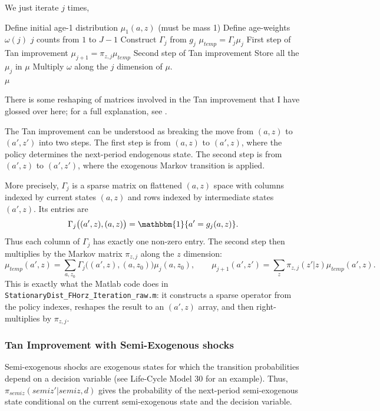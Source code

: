 We just iterate $j$ times,
\begin{algorithmic}
 \State Define initial age-1 distribution $\mu_1(a,z)$ (must be mass 1)
 \State Define age-weights $\omega(j)$
 \For $j$ counts from $1$ to $J-1$
  \State Construct $\Gamma_j$ from $g_j$
  \State $\mu_{temp}=\Gamma_j \mu_j$ \Comment First step of Tan improvement
  \State $\mu_{j+1}=\pi_{z,j} \mu_{temp}$ \Comment Second step of Tan improvement
 \EndFor
 \State Store all the $\mu_j$ in $\mu$
  \State Multiply $\omega$ along the $j$ dimension of $\mu$.
 \\ \Return $\mu$
 \end{algorithmic}
There is some reshaping of matrices involved in the Tan improvement that I have glossed over here; for a full explanation, see \cite{Tan2020}.

The Tan improvement can be understood as breaking the move from $(a,z)$ to $(a',z')$ into two steps. The first step is from $(a,z)$ to $(a',z)$, where the policy determines the next-period endogenous state. The second step is from $(a',z)$ to $(a',z')$, where the exogenous Markov transition is applied.

More precisely, $\Gamma_j$ is a sparse matrix on flattened $(a,z)$ space with columns indexed by current states $(a,z)$ and rows indexed by intermediate states $(a',z)$. Its entries are
\[
\Gamma_j\big((a',z),(a,z)\big)=\mathbbm{1}\{a'=g_j(a,z)\}.
\]
Thus each column of $\Gamma_j$ has exactly one non-zero entry. The second step then multiplies by the Markov matrix $\pi_{z,j}$ along the $z$ dimension:
\[
\mu_{temp}(a',z)=\sum_{a,z_0}\Gamma_j\big((a',z),(a,z_0)\big)\mu_j(a,z_0),
\qquad
\mu_{j+1}(a',z')=\sum_{z}\pi_{z,j}(z'|z)\mu_{temp}(a',z).
\]
This is exactly what the Matlab code does in \texttt{StationaryDist\_FHorz\_Iteration\_raw.m}: it constructs a sparse operator from the policy indexes, reshapes the result to an $(a',z)$ array, and then right-multiplies by $\pi_{z,j}$.

\subsubsection{Tan Improvement with Semi-Exogenous shocks}
Semi-exogenous shocks are exogenous states for which the transition probabilities depend on a decision variable (see Life-Cycle Model 30 for an example). Thus, $\pi_{semiz}(semiz'|semiz,d)$ gives the probability of the next-period semi-exogenous state conditional on the current semi-exogenous state and the decision variable.

